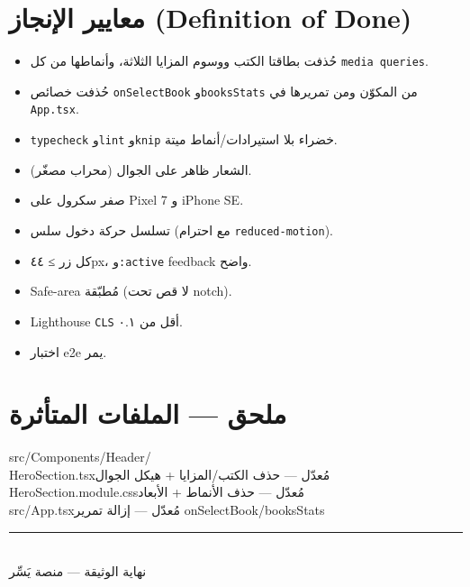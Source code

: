 \documentclass[11pt]{article}
\newcommand{\code}[1]{\textcolor{darkbg}{\texttt{\small #1}}}
\begin{document}
\section{معايير الإنجاز (Definition of Done)}
\begin{okbox}
\begin{itemize}
\item[\faCheck] حُذفت بطاقتا الكتب ووسوم المزايا الثلاثة، وأنماطها من كل \code{media queries}.
\item[\faCheck] حُذفت خصائص \code{onSelectBook} و\code{booksStats} من المكوّن ومن تمريرها في \code{App.tsx}.
\item[\faCheck] \code{typecheck} و\code{lint} و\code{knip} خضراء بلا استيرادات/أنماط ميتة.
\item[\faCheck] الشعار ظاهر على الجوال (محراب مصغّر).
\item[\faCheck] صفر سكرول على Pixel 7 و iPhone SE.
\item[\faCheck] تسلسل حركة دخول سلس (مع احترام \code{reduced-motion}).
\item[\faCheck] كل زر ≥ ٤٤px، و\code{:active} feedback واضح.
\item[\faCheck] Safe-area مُطبّقة (لا قص تحت notch).
\item[\faCheck] Lighthouse \code{CLS} أقل من ٠.١.
\item[\faCheck] اختبار e2e يمر.
\end{itemize}
\end{okbox}

\section{ملحق — الملفات المتأثرة}
\begin{tcolorbox}[colback=codebg, colframe=codebg, coltext=white, arc=3pt, left=8pt, right=8pt]
\ttfamily\small\raggedleft
src/Components/Header/\\
\hspace*{1em}HeroSection.tsx\hspace{1em}\textcolor{okgreen}{مُعدّل — حذف الكتب/المزايا + هيكل الجوال}\\
\hspace*{1em}HeroSection.module.css\hspace*{1em}\textcolor{okgreen}{مُعدّل — حذف الأنماط + الأبعاد}\\
src/App.tsx\hspace*{1em}\textcolor{okgreen}{مُعدّل — إزالة تمرير onSelectBook/booksStats}\\
\end{tcolorbox}

\vfill
\begin{center}
\rule{0.5\textwidth}{0.4pt}\\[0.4cm]
{\small\color{midgray} نهاية الوثيقة — منصة يَسِّر}
\end{center}
\end{document}
